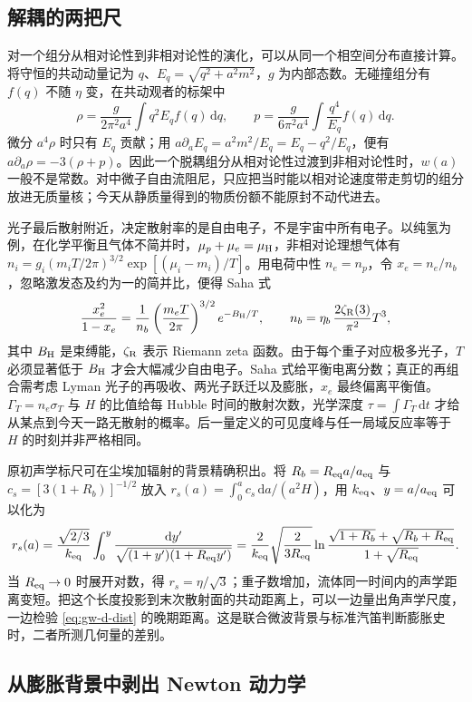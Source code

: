 \subsection{解耦的两把尺}

对一个组分从相对论性到非相对论性的演化，可以从同一个相空间分布直接计算。将守恒的共动动量记为 $q$、$E_q=\sqrt{q^2+a^2m^2}$，$g$ 为内部态数。无碰撞组分有 $f(q)$ 不随 $\eta$ 变，在共动观者的标架中
\[
 \rho=\frac{g}{2\pi^2a^4}\int q^2 E_q f(q)\,\mathrm dq,\qquad
 p=\frac{g}{6\pi^2a^4}\int\frac{q^4}{E_q} f(q)\,\mathrm dq .
\]
微分 $a^4\rho$ 时只有 $E_q$ 贡献；用 $a\partial_a E_q=a^2m^2/E_q=E_q-q^2/E_q$，便有 $a\partial_a\rho=-3(\rho+p)$。因此一个脱耦组分从相对论性过渡到非相对论性时，$w(a)$ 一般不是常数。对中微子自由流阻尼，只应把当时能以相对论速度带走剪切的组分放进无质量核；今天从静质量得到的物质份额不能原封不动代进去。

光子最后散射附近，决定散射率的是自由电子，不是宇宙中所有电子。以纯氢为例，在化学平衡且气体不简并时，$\mu_p+\mu_e=\mu_{\rm H}$，非相对论理想气体有 $n_i=g_i(m_iT/2\pi)^{3/2}\exp[(\mu_i-m_i)/T]$。用电荷中性 $n_e=n_p$，令 $x_e=n_e/n_b$，忽略激发态及约为一的简并比，便得 Saha 式
\[
 \frac{x_e^2}{1-x_e}=\frac{1}{n_b}\left(\frac{m_eT}{2\pi}\right)^{3/2}
              e^{-B_{\rm H}/T},
 \qquad n_b=\eta_b\,\frac{2\zeta_{\rm R}(3)}{\pi^2}T^3 ,
\]
其中 $B_{\rm H}$ 是束缚能，$\zeta_{\rm R}$ 表示 Riemann zeta 函数。由于每个重子对应极多光子，$T$ 必须显著低于 $B_{\rm H}$ 才会大幅减少自由电子。Saha 式给平衡电离分数；真正的再组合需考虑 Lyman 光子的再吸收、两光子跃迁以及膨胀，$x_e$ 最终偏离平衡值。$\Gamma_T=n_e\sigma_T$ 与 $H$ 的比值给每 Hubble 时间的散射次数，光学深度 $\tau=\int\Gamma_T\,\mathrm dt$ 才给从某点到今天一路无散射的概率。后一量定义的可见度峰与任一局域反应率等于 $H$ 的时刻并非严格相同。

原初声学标尺可在尘埃加辐射的背景精确积出。将 $R_b=R_{\rm eq}a/a_{\rm eq}$ 与 $c_s=[3(1+R_b)]^{-1/2}$ 放入 $r_s(a)=\int_0^a c_s\,\mathrm da/(a^2H)$，用 $k_{\rm eq}$、$y=a/a_{\rm eq}$ 可以化为
\[
 r_s(a)=\frac{\sqrt{2/3}}{k_{\rm eq}}\int_0^y
             \frac{\mathrm dy'}{\sqrt{(1+y')(1+R_{\rm eq}y')}}
 =\frac{2}{k_{\rm eq}}\sqrt{\frac{2}{3R_{\rm eq}}}
   \ln\frac{\sqrt{1+R_b}+\sqrt{R_b+R_{\rm eq}}}{1+\sqrt{R_{\rm eq}}}.
\]
当 $R_{\rm eq}\to0$ 时展开对数，得 $r_s=\eta/\sqrt3$；重子数增加，流体同一时间内的声学距离变短。把这个长度投影到末次散射面的共动距离上，可以一边量出角声学尺度，一边检验 \eqref{eq:gw-d-dist} 的晚期距离。这是联合微波背景与标准汽笛判断膨胀史时，二者所测几何量的差别。

\subsection{从膨胀背景中剥出 Newton 动力学}

